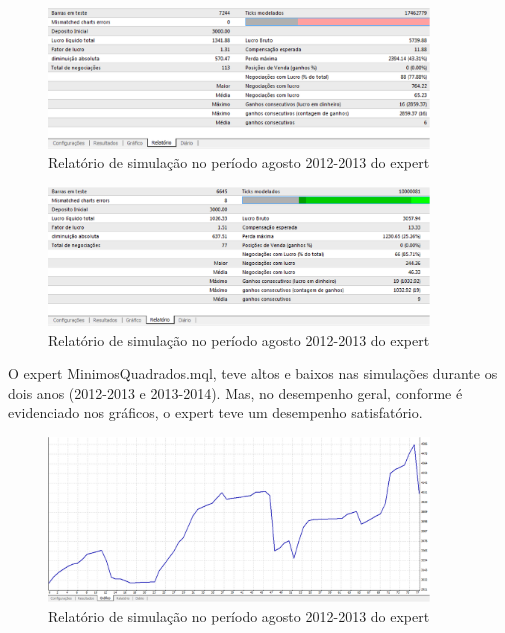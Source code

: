 \begin{figure}[H]
\centering
\includegraphics[width=0.9\textwidth]{figuras/protocoloMinimos}
\caption{Relatório de simulação no período agosto 2012-2013 do expert}
\label{protocoloMinimos}
\end{figure}

\begin{figure}[H]
\centering
\includegraphics[width=0.9\textwidth]{figuras/protocoloMinimos2}
\caption{Relatório de simulação no período agosto 2012-2013 do expert}
\label{protocoloMinimos2}
\end{figure}

O expert MinimosQuadrados.mql, teve altos e baixos nas simulações durante os dois anos (2012-2013 e 2013-2014). Mas, no desempenho geral, conforme é evidenciado nos gráficos, o expert teve um desempenho satisfatório.

\begin{figure}[H]
\centering
\includegraphics[width=0.9\textwidth]{figuras/protocoloMinimos3}
\caption{Relatório de simulação no período agosto 2012-2013 do expert}
\label{protocoloMinimos3}
\end{figure}

